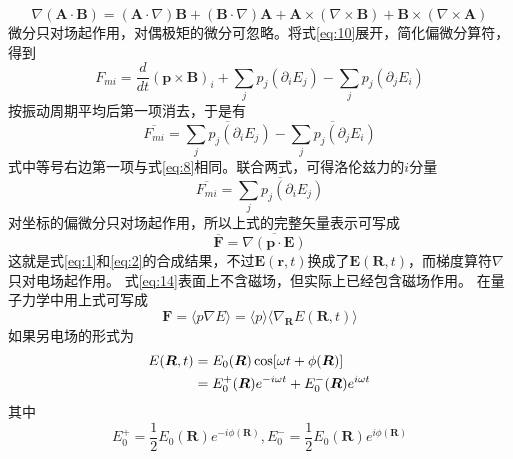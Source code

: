\documentclass{article}
\begin{document}
	\begin{equation*}
		\nabla(\boldsymbol{A} \cdot \boldsymbol{B}) = (\boldsymbol{A} \cdot \nabla)\boldsymbol{B} + (\boldsymbol{B} \cdot \nabla)\boldsymbol{A} + \boldsymbol{A} \times (\nabla \times \boldsymbol{B}) + \boldsymbol{B} \times (\nabla \times \boldsymbol{A})
	\end{equation*}
	微分只对场起作用，对偶极矩的微分可忽略。将式\ref{eq:10}展开，简化偏微分算符，得到
	\begin{equation}
		F_{mi} = \frac{d}{dt}(\boldsymbol{p} \times \boldsymbol{B})_i + \sum_j p_j(\partial_i E_j) - \sum_j p_j(\partial_j E_i) \label{eq:11}
	\end{equation}
	按振动周期平均后第一项消去，于是有
	\begin{equation}
		\overline{F_{mi}} = \overline{\sum_j p_j(\partial_i E_j)} - \overline{\sum_j p_j(\partial_j E_i)} \label{eq:12}
	\end{equation}
	式中等号右边第一项与式\ref{eq:8}相同。联合两式，可得洛伦兹力的$i$分量
	\begin{equation}
		\overline{F_{mi}} = \overline{\sum_j p_j(\partial_i E_j)} \label{eq:13}
	\end{equation}
	对坐标的偏微分只对场起作用，所以上式的完整矢量表示可写成
	\begin{equation}
		\overline{\boldsymbol{F}} = \overline{\nabla(\boldsymbol{p} \cdot \boldsymbol{E})} \label{eq:14}
	\end{equation}
	这就是式\ref{eq:1}和\ref{eq:2}的合成结果，不过$\boldsymbol{E}(\boldsymbol{r},t)$换成了$\boldsymbol{E}(\boldsymbol{R},t)$，而梯度算符$\nabla$只对电场起作用。
	式\ref{eq:14}表面上不含磁场，但实际上已经包含磁场作用。
	在量子力学中用上式可写成
	\begin{equation}
		\boldsymbol{F} = \langle p \nabla E \rangle = \langle p \rangle \langle \nabla_{\boldsymbol{R}}E(\boldsymbol{R},t) \rangle \label{eq:15}
	\end{equation}
	如果另电场的形式为
	\begin{align}
		E(\boldsymbol{R},t) &= E_0(\boldsymbol{R})\cos[\omega t + \phi(\boldsymbol{R})] \notag \\
		&= E_0^+(\boldsymbol{R})e^{-i\omega t} + E_0^-(\boldsymbol{R})e^{i\omega t} \label{eq:16}
	\end{align}
	其中
	\begin{equation}
		E_0^+ = \frac{1}{2}E_0(\boldsymbol{R})e^{-i\phi(\boldsymbol{R})},  E_0^- = \frac{1}{2}E_0(\boldsymbol{R})e^{i\phi (\boldsymbol{R})} \label{eq:17}
	\end{equation}
\end{document}
